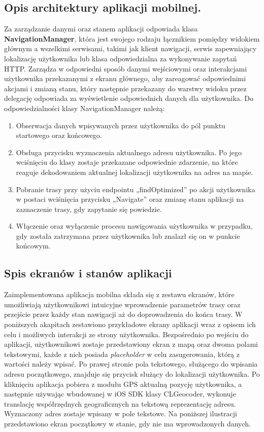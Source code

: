 \subsection{Opis architektury aplikacji mobilnej.}

Za zarządzanie danymi oraz stanem aplikacji odpowiada klasa \textbf{NavigationManager}, która jest swojego rodzaju łącznikiem pomiędzy widokiem głównym a wszelkimi serwisami, takimi jak klient nawigacji, serwis zapewniający lokalizację użytkownika lub klasa odpowiedzialna za wykonywanie zapytań HTTP. Zarządza w odpowiedni sposób danymi wejściowymi oraz interakcjami użytkownika przekazanymi z ekranu głównego, aby zareagować odpowiednimi akcjami i zmianą stanu, który następnie przekazany do warstwy widoku przez delegację odpowiada za wyświetlenie odpowiednich danych dla użytkownika. Do odpowiedzialności klasy NavigationManager należą:

\begin{enumerate}
\item Obserwacja danych wpisywanych przez użytkownika do pól punktu startowego oraz końcowego.
\item Obsługa przycisku wyznaczenia aktualnego adresu użytkownika. Po jego wciśnięciu do klasy zostaje przekazane odpowiednie zdarzenie, na które reaguje dekodowaniem aktualnej lokalizacji użytkownika na adres na mapie.
\item Pobranie trasy przy użyciu endpointu „findOptimized” po akcji użytkownika w postaci wciśnięcia przycisku „Navigate” oraz zmianę stanu aplikacji na zaznaczenie trasy, gdy zapytanie się powiedzie.
\item Włączenie oraz wyłączenie procesu nawigowania użytkownika w przypadku, gdy została zatrzymana przez użytkownika lub znalazł się on w punkcie końcowym.
\end{enumerate}

\subsection{Spis ekranów i stanów aplikacji}

Zaimplementowana aplikacja mobilna składa się z zestawu ekranów, które umożliwiają użytkownikowi intuicyjne wprowadzenie parametrów trasy oraz przejście przez każdy stan nawigacji aż do doprowadzenia do końca trasy. W poniższych akapitach zestawiono przykładowe ekrany aplikacji wraz z opisem ich celu i możliwych interakcji ze strony użytkownika.
Bezpośrednio po wejściu do aplikacji, użytkownikowi zostaje przedstawiony ekran z mapą oraz dwoma polami tekstowymi, każde z nich posiada \textit{placeholder} w celu zasugerowania, którą z wartości należy wpisać. Po prawej stronie pola tekstowego, służącego do wpisania adresu początkowego, znajduje się przycisk służący do lokalizacji użytkownika. Po kliknięciu aplikacja pobiera z modułu GPS aktualną pozycję użytkownika, a następnie używając wbudowanej w iOS SDK klasy CLGeocoder, wykonuje translację współrzędnych geograficznych na tekstową reprezentację adresu. Wyznaczony adres zostaje wpisany w pole tekstowe. Na poniższej ilustracji przedstawiono ekran początkowy w stanie, gdy nie ma wprowadzonych danych.


